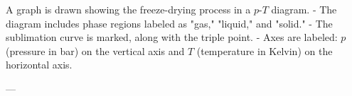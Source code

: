 A graph is drawn showing the freeze-drying process in a \( p \)-\( T \) diagram.  
- The diagram includes phase regions labeled as "gas," "liquid," and "solid."  
- The sublimation curve is marked, along with the triple point.  
- Axes are labeled: \( p \) (pressure in bar) on the vertical axis and \( T \) (temperature in Kelvin) on the horizontal axis.  

---